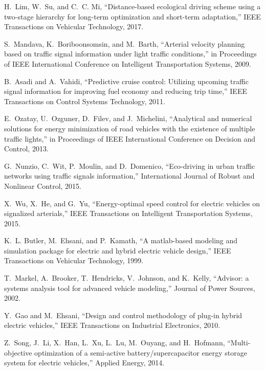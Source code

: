 H.~Lim, W.~Su, and C.~C. Mi, ``Distance-based ecological driving scheme using a
  two-stage hierarchy for long-term optimization and short-term adaptation,''
  IEEE Transactions on Vehicular Technology, 2017.

S.~Mandava, K.~Boriboonsomsin, and M.~Barth, ``Arterial velocity planning based
  on traffic signal information under light traffic conditions,'' in 
  Proceedings of IEEE International Conference on Intelligent Transportation
  Systems, 2009.

B.~Asadi and A.~Vahidi, ``Predictive cruise control: Utilizing upcoming traffic
  signal information for improving fuel economy and reducing trip time,'' 
  IEEE Transactions on Control Systems Technology, 2011.

E.~Ozatay, U.~Ozguner, D.~Filev, and J.~Michelini, ``Analytical and numerical
  solutions for energy minimization of road vehicles with the existence of
  multiple traffic lights,'' in Proceedings of IEEE International
  Conference on Decision and Control, 2013.

G.~Nunzio, C.~Wit, P.~Moulin, and D.~Domenico, ``Eco-driving in urban traffic
  networks using traffic signals information,'' International Journal of
  Robust and Nonlinear Control, 2015.

X.~Wu, X.~He, and G.~Yu, ``Energy-optimal speed control for electric vehicles
  on signalized arterials,'' IEEE Transactions on Intelligent
  Transportation Systems, 2015.

K.~L. Butler, M.~Ehsani, and P.~Kamath, ``A matlab-based modeling and
  simulation package for electric and hybrid electric vehicle design,''
  IEEE Transactions on Vehicular Technology, 1999.

T.~Markel, A.~Brooker, T.~Hendricks, V.~Johnson, and K.~Kelly, ``Advisor: a
  systems analysis tool for advanced vehicle modeling,'' Journal of Power
  Sources, 2002.

Y.~Gao and M.~Ehsani, ``Design and control methodology of plug-in hybrid
  electric vehicles,'' IEEE Transactions on Industrial Electronics, 2010.

Z.~Song, J.~Li, X.~Han, L.~Xu, L.~Lu, M.~Ouyang, and H.~Hofmann,
  ``Multi-objective optimization of a semi-active battery/supercapacitor energy
  storage system for electric vehicles,'' Applied Energy, 2014.

